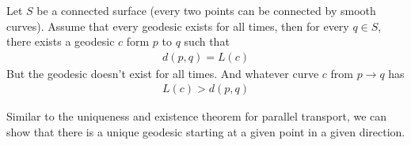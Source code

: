 \documentclass[10pt]{article}
\begin{document}
            \begin{theorem}
                Let $S$ be a connected surface (every two points can be connected by smooth curves). Assume that every geodesic exists for all times, then for every $q\in S$, there exists a geodesic $c$ form $p$ to $q$ such that 
                \begin{equation*}
                    \begin{aligned}
                        d(p, q) = L(c)
                    \end{aligned}
                \end{equation*}
                But the geodesic doesn't exist for all times. And whatever curve $c$ from $p\rightarrow q$ has
                \begin{equation*}
                    \begin{aligned}
                        L(c) > d(p, q)
                    \end{aligned}
                \end{equation*}
            \end{theorem}

            Similar to the uniqueness and existence theorem for parallel transport, we can show that there is a unique geodesic starting at a given point in a given direction.
\end{document}
